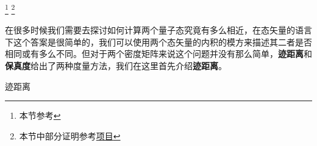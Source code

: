 
\footnote{本节参考\cite{量子信息}}
\footnote{本节中部分证明参考\href{https://github.com/goropikari/SolutionQCQINielsenChuang}{项目}}


在很多时候我们需要去探讨如何计算两个量子态究竟有多么相近，在态矢量的语言下这个答案是很简单的，我们可以使用两个态矢量的内积的模方来描述其二者是否相同或有多么不同。但对于两个密度矩阵来说这个问题并没有那么简单，\textbf{迹距离}和\textbf{保真度}给出了两种度量方法，我们在这里首先介绍\textbf{迹距离}。

\begin{definition}{迹距离}

\end{definition}




